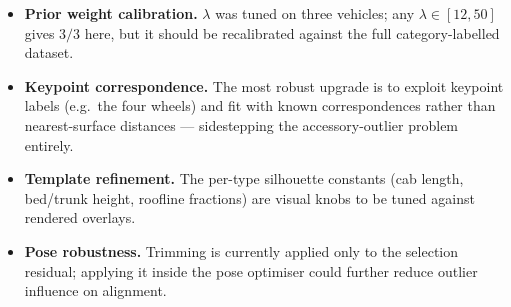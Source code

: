 \documentclass[11pt]{article}
\theoremstyle{definition}
\begin{document}
\begin{itemize}[leftmargin=2em]
    \item \textbf{Prior weight calibration.} $\lambda$ was tuned on three vehicles; any $\lambda \in [12, 50]$ gives $3/3$ here, but it should be recalibrated against the full category-labelled dataset.
    \item \textbf{Keypoint correspondence.} The most robust upgrade is to exploit keypoint labels (e.g.\ the four wheels) and fit with known correspondences rather than nearest-surface distances --- sidestepping the accessory-outlier problem entirely.
    \item \textbf{Template refinement.} The per-type silhouette constants (cab length, bed/trunk height, roofline fractions) are visual knobs to be tuned against rendered overlays.
    \item \textbf{Pose robustness.} Trimming is currently applied only to the selection residual; applying it inside the pose optimiser could further reduce outlier influence on alignment.
\end{itemize}
\end{document}
